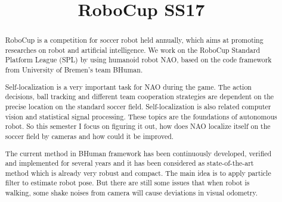 \documentclass[ICS, PP, english, final]{ICS_thesis}
\begin{document}
\title{RoboCup SS17}


\maketitle



\phantom{u}
\begin{abstract}
RoboCup is a competition for soccer robot held annually, which aims at promoting researches on robot and artificial intelligence. We work on the RoboCup Standard Platform League (SPL) by using humanoid robot NAO, based on the code framework from University of Bremen's team BHuman.

Self-localization is a very important task for NAO during the game. The action decisions, ball tracking and different team cooperation strategies are dependent on the precise location on the standard soccer field. Self-localization is also related computer vision and statistical signal processing. These topics are the foundations of autonomous robot. So this semester I focus on figuring it out, how does NAO localize itself on the soccer field by cameras and how could it be improved.

The current method in BHuman framework has been continuously developed, verified and implemented for several years and it has been considered as state-of-the-art method which is already very robust and compact. The main idea is to apply particle filter to estimate robot pose. But there are still some issues that when robot is walking, some shake noises from camera will cause deviations in visual odometry.
\end{abstract}


\phantom{u}
\phantom{1}\vspace{6cm}
\begin{center}
\end{center}


\pagestyle{fancy}
\end{document}
